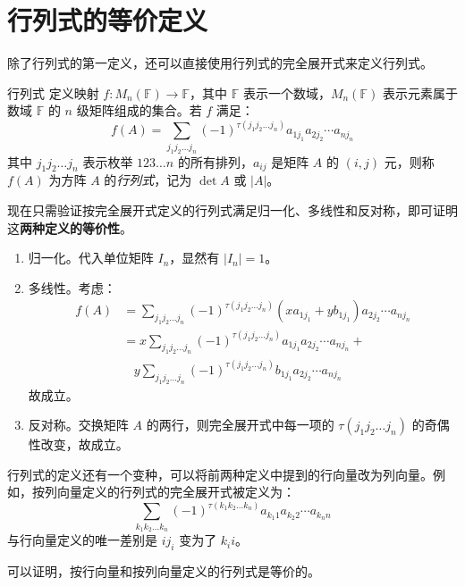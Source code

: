 
\section{行列式的等价定义}

除了行列式的第一定义，还可以直接使用行列式的完全展开式来定义行列式。

\begin{definition}{行列式}
	定义映射 $f: M_n(\mathbb F) \to \mathbb F$，其中 $\mathbb F$ 表示一个数域，$M_n(\mathbb F)$ 表示元素属于数域 $\mathbb F$ 的 $n$ 级矩阵组成的集合。若 $f$ 满足：
	$$
	f(A) = \sum_{j_1 j_2 \ldots j_n} (-1)^{\tau(j_1 j_2 \ldots j_n)} a_{1j_1} a_{2j_2} \cdots a_{nj_n}
	$$
	其中 $j_1 j_2 \ldots j_n$ 表示枚举 $123 \ldots n$ 的所有排列，$a_{ij}$ 是矩阵 $A$ 的 $(i, j)$ 元，则称 $f(A)$ 为方阵 $A$ 的\emph{行列式}，记为 $\det A$ 或 $|A|$。
\end{definition}

现在只需验证按完全展开式定义的行列式满足归一化、多线性和反对称，即可证明这\textbf{两种定义的等价性}。

\begin{enumerate}
	\item 归一化。代入单位矩阵 $I_n$，显然有 $|I_n| = 1$。
	\item 多线性。考虑：
	$$
	\begin{aligned}
		f(A) &= \sum_{j_1 j_2 \ldots j_n} (-1)^{\tau(j_1 j_2 \ldots j_n)} (x a_{1j_1} + y b_{1 j_1}) a_{2j_2} \cdots a_{nj_n}
		\\&=
		x \sum_{j_1 j_2 \ldots j_n} (-1)^{\tau(j_1 j_2 \ldots j_n)} a_{1j_1} a_{2j_2} \cdots a_{nj_n} +
		\\&~~~~
		y \sum_{j_1 j_2 \ldots j_n} (-1)^{\tau(j_1 j_2 \ldots j_n)} b_{1j_1} a_{2j_2} \cdots a_{nj_n}
	\end{aligned}
	$$
	故成立。
	\item 反对称。交换矩阵 $A$ 的两行，则完全展开式中每一项的 $\tau(j_1 j_2 \ldots j_n)$ 的奇偶性改变，故成立。
\end{enumerate}

行列式的定义还有一个变种，可以将前两种定义中提到的行向量改为列向量。例如，按列向量定义的行列式的完全展开式被定义为：
$$
\sum_{k_1 k_2 \ldots k_n} (-1)^{\tau(k_1 k_2 \ldots k_n)} a_{k_1 1} a_{k_2 2} \cdots a_{k_n n}
$$
与行向量定义的唯一差别是 $i j_i$ 变为了 $k_i i$。

可以证明，按行向量和按列向量定义的行列式是等价的。

